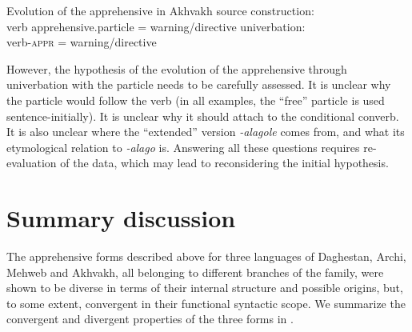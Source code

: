 \documentclass[output=paper,colorlinks,citecolor=brown]{langscibook}
\begin{document}
\ea \label{ex:DD78} \textnormal{Evolution of the apprehensive in Akhvakh}
\ea \label{ex:DD78a} \textnormal{source construction:} \\
\textnormal{{\ob}verb apprehensive.particle{\cb} = warning/directive}
\ex \label{ex:DD78b} \textnormal{univerbation:} \\
\textnormal{{\ob}verb-\textsc{appr}{\cb} = warning/directive}
\z
\z

 However, the hypothesis of the evolution of the apprehensive through univerbation with the particle needs to be carefully assessed. It is unclear why the particle would follow the verb (in all examples, the ``free'' particle is used sentence-initially). It is unclear why it should attach to the conditional converb. It is also unclear where the ``extended'' version \textit{-alagole} comes from, and what its etymological relation to \textit{-alago} is. Answering all these questions requires re-evaluation of the data, which may lead to reconsidering the initial hypothesis.



\section{Summary discussion}
\label{daniel:summary}
 
The apprehensive forms described above for three languages of Daghestan, Archi, Mehweb and Akhvakh, all belonging to different branches of the family, were shown to be diverse in terms of their internal structure and possible origins, but, to some extent, convergent in their functional syntactic scope. We summarize the convergent and divergent properties of the three forms in .
 
\end{document}
